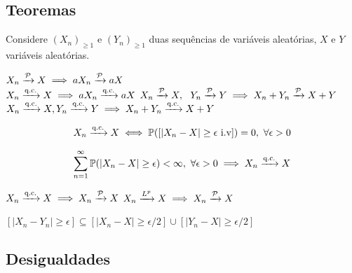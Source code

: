 \subsection{Teoremas}

\begin{theorem}
	Considere $(X_n)_{\geq1}$ e $(Y_n)_{\geq1}$ duas sequências de variáveis aleatórias, $X$ e $Y$ variáveis aleatórias.
	\begin{outline}[enumerate]
		\1 $X_n\xrightarrow{\mathcal{P}} X \implies aX_n \xrightarrow{\mathcal{P}} aX$ \\
		   $X_n\xrightarrow{\text{q.c.}} X \implies aX_n \xrightarrow{\text{q.c.}} aX$  
		\1 $X_n\xrightarrow{\mathcal{P}} X, \ \ Y_n\xrightarrow{\mathcal{P}} Y \implies X_n+Y_n\xrightarrow{\mathcal{P}} X+Y$ \\
		   $X_n\xrightarrow{\text{q.c.}} X, Y_n\xrightarrow{\text{q.c.}} Y \implies X_n+Y_n\xrightarrow{\text{q.c.}} X+Y$
	\end{outline}
\end{theorem}

\begin{theorem}
	\begin{equation}
		X_n\xrightarrow{\text{q.c.}} X \iff \mathbb{P}([|X_n-X|\geq\epsilon \text{ i.v}]) = 0, \ \forall \epsilon>0
	\end{equation}
\end{theorem}

\begin{theorem}
	\begin{equation}
		 \sum_{n=1}^{\infty}\mathbb{P}(|X_n-X|\geq\epsilon) < \infty, \ \forall \epsilon>0 \implies X_n\xrightarrow{\text{q.c.}} X
	\end{equation}
\end{theorem}

\begin{theorem}
	\leavevmode
	\begin{outline}[enumerate]
		\1 \( X_n\xrightarrow{\text{q.c.}} X \implies X_n\xrightarrow{\mathcal{P}} X \)
		\1 \( X_n \xrightarrow{L^p} X \implies X_n \xrightarrow{\mathcal{P}} X \) 
	\end{outline}
\end{theorem}


\begin{theorem}
	\leavevmode
	\begin{outline}[enumerate]
		\1 \( [|X_n-Y_n| \geq \epsilon] \subseteq [|X_n-X| \geq \epsilon/2]\cup 
		  [|Y_n-X| \geq \epsilon/2] \) 
	\end{outline}
\end{theorem}


\subsection{Desigualdades}

